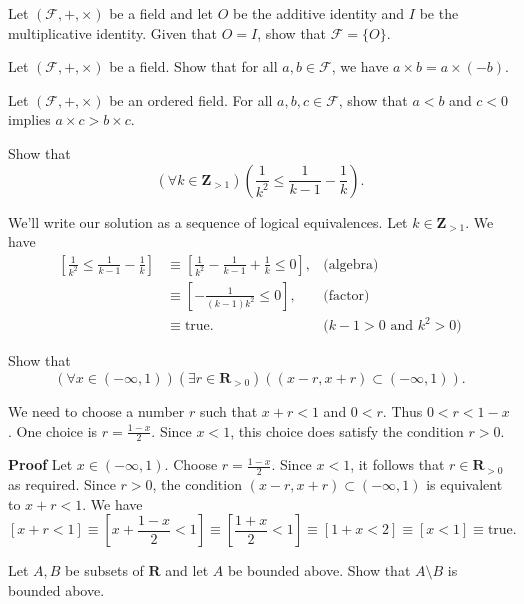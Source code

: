 \documentclass[12pt,fleqn]{exam}
\newcommand{\reals}{\mathbf{R}}
\newcommand{\integers}{\mathbf{Z}}
\newcommand{\true}{\mbox{true}}
\begin{document}
\begin{questions}
\question Let $(\mathcal{F},+, \times)$ be a field and let $O$ be the additive identity and $I$ be the multiplicative
identity. Given that $O = I$, show that $\mathcal{F} = \{O\}$.

\question Let $(\mathcal{F},+, \times)$ be a field. Show that for all $a,b \in \mathcal{F}$, we have $a \times b = a \times (-b)$.

\question Let $(\mathcal{F},+, \times)$ be an ordered  field. For all $a,b,c \in \mathcal{F}$, show that $a < b$ and $c < 0$
implies $a \times c > b \times c$.

\question Show that 
\[
    \left(\forall k \in \integers_{>1} \right) 
      \left(\frac{1}{k^2} \leq \frac{1}{k-1} - \frac{1}{k} \right).
\]

\begin{solution}
  We'll write our solution as a sequence of logical equivalences. Let $k \in 
  \integers_{>1}$. We have
  \begin{align*}
    \left[\frac{1}{k^2} \leq \frac{1}{k-1} - \frac{1}{k} \right] &\equiv
    \left[\frac{1}{k^2} - \frac{1}{k-1} + \frac{1}{k}  \leq 0 \right], &\mbox{(algebra)} \\
    &\equiv \left[ -\frac{1}{(k-1) k^2}  \leq 0 \right], &\mbox{(factor)} \\
    &\equiv \true. &\mbox{($k - 1 > 0$ and $k^2 > 0$)}
  \end{align*}
  
\end{solution}
\question Show that
\[
    \left(\forall x \in (-\infty, 1) \right)\left( \exists r \in \reals_{>0} \right)
    \left((x-r,x+r) \subset (-\infty, 1) \right).
\]

\begin{solution}
  We need to choose a number $r$ such that $x+r < 1$ and $0 < r$. 
  Thus $0 < r < 1-x$. One choice is $r = \frac{1-x}{2}$. Since $x < 1$,
  this choice does satisfy the condition $r > 0$.

  \textbf{Proof} Let $x \in (-\infty, 1) $. Choose $r = \frac{1-x}{2}$. Since  $x < 1$,
  it follows that $r \in  \reals_{>0}$ as required. Since $ r > 0$, the condition
  \( (x-r,x+r) \subset (-\infty, 1)\) is equivalent to $x + r < 1$.
  We have
  \[
    \left[x + r < 1 \right] \equiv  \left[x +  \frac{1-x}{2} < 1 \right]
    \equiv \left[\frac{1+x}{2} < 1 \right] \equiv \left[1+x < 2 \right]
    \equiv \left[ x < 1 \right] \equiv \true.
  \]
\end{solution}

\question Let $A,B$ be subsets of $\reals$ and let $A$ be bounded above.
Show that $A \setminus B$ is bounded above.


\end{questions}
\end{document}
